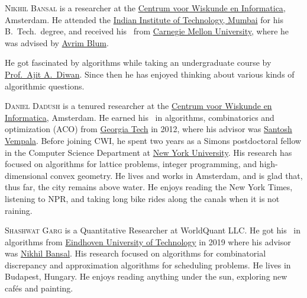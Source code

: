 \documentclass{toc}
\begin{document}
%
%
%
%
%
%
%
%
%
%
%
%
%
%
\begin{tocaboutauthors}
\begin{tocabout}[bansal] 
 \textsc{Nikhil Bansal} is a researcher at the
\href{http://www.cwi.nl}{Centrum voor Wiskunde en Informatica}, 
Amsterdam.
He attended the \href{http://www.iitb.ac.in/}{Indian Institute of Technology,
Mumbai} for his B.\ Tech.\  degree, and received his \phd\
from \href{http://www.cmu.edu/}{Carnegie Mellon University},
where he was advised by
\href{https://ttic.uchicago.edu/~avrim/}{Avrim Blum}.

\noindent
He got fascinated by algorithms
%
while   %
taking an undergraduate course  
by \href{https://www.cse.iitb.ac.in/~aad/}{Prof.~Ajit A.~Diwan}.
Since then he has enjoyed thinking about various kinds of
algorithmic questions.
\end{tocabout}

\begin{tocabout}[dadush]
\textsc{Daniel Dadush} is a tenured researcher at the 
\href{http://www.cwi.nl}{Centrum voor Wiskunde en Informatica}, Amsterdam.
He earned his \phd\ in algorithms, combinatorics and optimization (ACO)
from \href{http://www.gatech.edu}{Georgia Tech} in 2012, where his advisor
was \href{https://www.cc.gatech.edu/~vempala/}{Santosh Vempala}. Before
joining CWI, he spent two years as a Simons postdoctoral fellow in the
Computer Science Department at \href{http://www.nyu.edu}{New York University}.
His research has focused on algorithms for lattice problems, integer
programming, and high-dimensional convex geometry. He lives and works in
Amsterdam, and is glad that, thus far, the city remains above water.
He enjoys reading the New York Times, listening to NPR, and taking long bike
rides along the canals when it is not raining.
\end{tocabout}

\begin{tocabout}[garg]
\textsc{Shashwat Garg} 
is a Quantitative Researcher at WorldQuant LLC\@. He got his \phd\
in algorithms
from \href{http://www.tue.nl}{Eindhoven University of Technology} in 2019
where his advisor was \href{https://www.win.tue.nl/~nikhil/}{Nikhil Bansal}.
His research focused on algorithms for combinatorial discrepancy and
approximation algorithms for scheduling problems.
He lives in Budapest, Hungary.  %
He enjoys reading anything under the sun, exploring new caf\'es 
and painting. 
\end{tocabout}


\end{tocaboutauthors}
\end{document}
